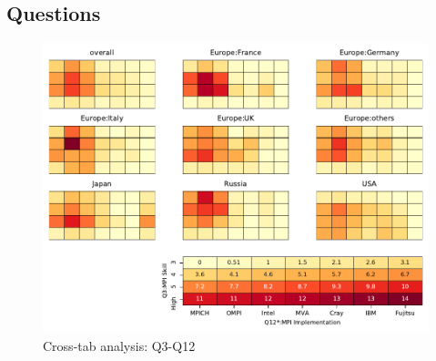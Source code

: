 
\subsection{Questions}


\begin{figure}
\begin{center}
\includegraphics[width=12cm]{../pdfs/Q3-Q12.pdf}
\caption{Cross-tab analysis: Q3-Q12}
\label{fig:Q3-Q12}
\end{center}
\end{figure}

